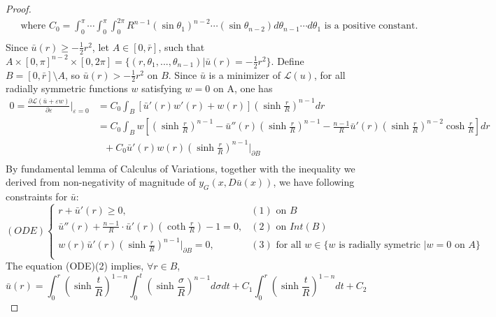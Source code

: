 \begin{proof}
\begin{equation*}
\begin{split}
	&\text{ where }	C_0=\int_{0}^{\pi}\cdots\int_{0}^{\pi}\int_{0}^{2\pi}R^{n-1}(\sin \theta_1)^{n-2}\cdots (\sin\theta_{n-2}) d\theta_{n-1}\cdots d\theta_1 \text{ is a positive constant.} \\
	\end{split}
	\end{equation*}
	Since $\bar{u}(r)\ge -\frac{1}{2}r^2$, let $A\in [0,\bar{r}]$, such that $A\times[0,\pi]^{n-2}\times[0,2\pi] = \{(r,\theta_1, ...,\theta_{n-1})| \bar{u}(r) = -\frac{1}{2}r^2\}$. Define $B =[0,\bar{r}]\setminus A$, so $\bar{u}(r)> -\frac{1}{2}r^2$ on $B$. Since $\bar{u}$ is a minimizer of $\mathcal{L}(u)$, for all radially symmetric functions $w$ satisfying $w=0$ on A, one has
	\begin{equation*}
	\begin{split}
	0=\frac{\partial \mathcal{L}(\bar{u}+\varepsilon w)}{\partial \varepsilon}\bigg|_{\varepsilon=0} &= C_0\int_B [\bar{u}'(r)w'(r)+w(r)](\sinh\frac{r}{R})^{n-1}dr\\
	&=C_0 \int_B w[(\sinh\frac{r}{R})^{n-1}-\bar{u}''(r)(\sinh\frac{r}{R})^{n-1}- \frac{n-1}{R}\bar{u}'(r)(\sinh\frac{r}{R})^{n-2}\cosh\frac{r}{R}]dr\\& \ \ \  +C_0 \bar{u}'(r)w(r)(\sinh\frac{r}{R})^{n-1}\bigg|_{\partial B}\\
	\end{split}
	\end{equation*}
	By fundamental lemma of Calculus of Variations, together with the inequality we derived from non-negativity of magnitude of $y_G(x, D\bar{u}(x))$, we have following constraints for $\bar{u}$:
	\begin{equation*}
	(ODE) \begin{cases} 
	r+\bar{u}'(r) \ge 0, & (1)\mbox{ on } B \\ 
	\bar{u}''(r)+\frac{n-1}{R}\cdot \bar{u}'(r)(\coth\frac{r}{R}) -1=0, & (2)\mbox{ on } Int(B) \\
	w(r)\bar{u}'(r)(\sinh\frac{r}{R})^{n-1}|_{\partial B} =0,&(3) \mbox{ for all } w\in \{w \mbox{ is radially symetric }| w= 0 \mbox{ on } A\}\\
	\end{cases}
	\end{equation*}
	The equation (ODE)(2) implies,  $\forall r \in B$,
	\begin{equation*}
	\bar{u}(r) = \int_{0}^{r}(\sinh\frac{t}{R})^{1-n} \int_{0}^{t} (\sinh\frac{\sigma }{R})^{n-1} d\sigma  dt + C_1 \int_{0}^{r}(\sinh\frac{t}{R})^{1-n} dt +C_2
	\end{equation*}

\end{proof}
